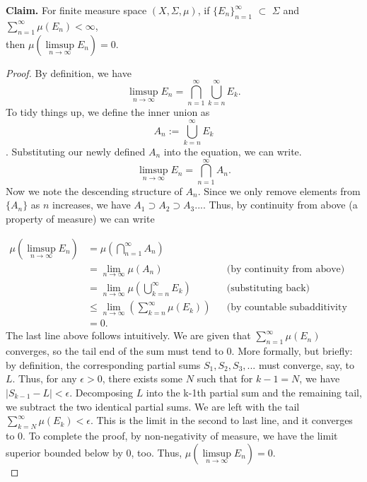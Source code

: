 \documentclass{article}
\begin{document}
\textbf{Claim.} For finite measure space $(X, \Sigma, \mu)$, if $\{E_n\}_{n=1}^{\infty}$ $\subset$ $\Sigma$ and 
$\sum\limits_{n=1}^{\infty} \mu(E_n) < \infty$, \\ then $\mu(\limsup\limits_{n\rightarrow\infty} E_n) = 0$.

\begin{proof}
By definition, we have $$\limsup\limits_{n\rightarrow\infty} E_n = \bigcap\limits_{n=1}^{\infty} \bigcup\limits_{k=n}^{\infty} E_k.$$
To tidy things up, we define the inner union as $$ A_n := \bigcup\limits_{k = n}^{\infty} E_k$$.
Substituting our newly defined $A_n$ into the equation, we can write. 
$$\limsup\limits_{n\rightarrow\infty} E_n = \bigcap\limits_{n=1}^{\infty} A_n.$$ 
Now we note the descending structure of $A_n$. Since we only remove elements from $\{A_n\}$ as $n$ increases, we have
$A_1 \supset A_2 \supset A_3 ... $. Thus, by continuity from above (a property of measure) we can write 

\begin{align*}
    \mu(\limsup\limits_{n\rightarrow\infty} E_n) &= \mu(\bigcap\limits_{n=1}^{\infty} A_n) \\
    &= \lim_{n\rightarrow\infty} \mu(A_n) &&\text{(by continuity from above)}\\
    &= \lim_{n\rightarrow\infty} \mu(\bigcup\limits_{k = n}^{\infty} E_k) &&\text{(substituting back)} \\ 
    &\leq \lim_{n\rightarrow\infty}(\sum\limits_{k = n}^{\infty} \mu(E_k)) &&\text{(by countable subadditivity property of measure)} \\
    &= 0.
\end{align*}
The last line above follows intuitively. We are given that $\sum\limits_{n=1}^{\infty} \mu(E_n)$ converges, so the tail end of the sum must tend to 0. 
More formally, but briefly: by definition, the corresponding partial sums $S_1, S_2, S_3, ...$ must converge, say, to $L$. Thus, for any $\epsilon > 0$, 
there exists some $N$ such that for $k - 1 = N$, we have $|S_{k-1} - L| < \epsilon$. Decomposing $L$ into the k-1th partial sum and the remaining tail, 
we subtract the two identical partial sums. We are left with the tail $\sum\limits_{k = N}^{\infty} \mu(E_k) < \epsilon$. This is the limit in the second to last line,
and it converges to 0. To complete the proof, by non-negativity of measure, we have the limit superior bounded below by 0, too. 
Thus, $\mu(\limsup\limits_{n\rightarrow\infty} E_n) = 0$. $\qedhere$ \\
\end{proof}
\end{document}
